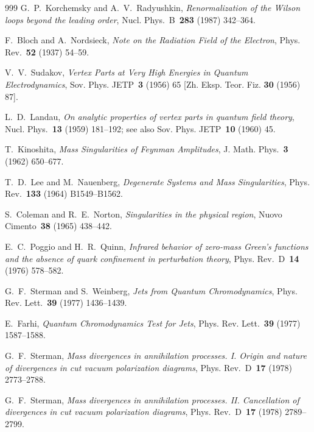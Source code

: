\begin{thebibliography}{999}
G.~P.~Korchemsky and A.~V.~Radyushkin, \emph{Renormalization of the Wilson loops beyond the leading order}, Nucl. Phys.~B~\textbf{283} (1987) \mbox{342--364}.

F.~Bloch and A.~Nordsieck, \emph{Note on the Radiation Field of the Electron}, Phys. Rev.~\textbf{52} (1937) \mbox{54--59}.

V.~V.~Sudakov, \emph{Vertex Parts at Very High Energies in Quantum Electrodynamics}, Sov. Phys. JETP~\textbf{3} (1956) \mbox{65} [Zh. Eksp. Teor. Fiz. \textbf{30} (1956) \mbox{87}].

L.~D.~Landau, \emph{On analytic properties of vertex parts in quantum field theory}, Nucl. Phys.~\textbf{13} (1959) \mbox{181--192}; see also Sov. Phys. JETP~\textbf{10} (1960) \mbox{45}.

T.~Kinoshita, \emph{Mass Singularities of Feynman Amplitudes}, J. Math. Phys.~\textbf{3} (1962) \mbox{650--677}.

T.~D.~Lee and M.~Nauenberg, \emph{Degenerate Systems and Mass Singularities}, Phys. Rev.~\textbf{133} (1964) \mbox{B1549--B1562}.

S.~Coleman and R.~E.~Norton, \emph{Singularities in the physical region}, Nuovo Cimento~\textbf{38} (1965) \mbox{438--442}.

E.~C.~Poggio and H.~R.~Quinn, \emph{Infrared behavior of zero-mass Green's functions and the absence of quark confinement in perturbation theory}, Phys. Rev.~D~\textbf{14} (1976) \mbox{578--582}.

G.~F.~Sterman and S.~Weinberg, \emph{Jets from Quantum Chromodynamics}, Phys. Rev. Lett.~\textbf{39} (1977) \mbox{1436--1439}.

E.~Farhi, \emph{Quantum Chromodynamics Test for Jets}, Phys. Rev. Lett.~\textbf{39} (1977) \mbox{1587--1588}.

G.~F.~Sterman, \emph{Mass divergences in annihilation processes. I. Origin and nature of divergences in cut vacuum polarization diagrams}, Phys. Rev.~D~\textbf{17} (1978) \mbox{2773--2788}.

G.~F.~Sterman, \emph{Mass divergences in annihilation processes. II. Cancellation of divergences in cut vacuum polarization diagrams}, Phys. Rev.~D~\textbf{17} (1978) \mbox{2789--2799}.


\end{thebibliography}
